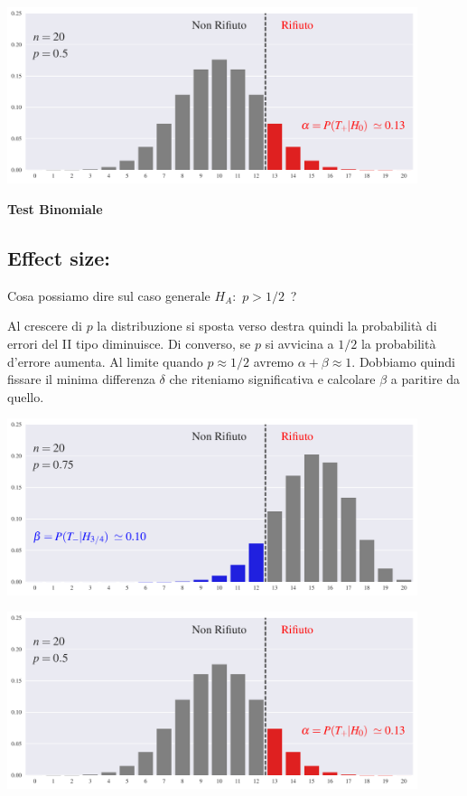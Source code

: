 \documentclass[12pt,openany]{book}
\theoremstyle{mio}
\theoremstyle{liscio}
\begin{document}
\hfil\includegraphics[width=0.9\textwidth]{figure/B-test_01.pdf}




\hfill{}\clearpage\hfill\textbf{Test Binomiale}\subsection{Effect size: \boldmath{$\delta$}}


Cosa possiamo dire sul caso generale $H_A:$ $p>1/2$~?

Al crescere di $p$ la distribuzione si sposta verso destra quindi la probabilità di errori del II tipo diminuisce. Di converso, se $p$ si avvicina a $1/2$  la probabilità d'errore aumenta. Al limite quando $p\approx 1/2$ avremo $\alpha+\beta\approx 1$. Dobbiamo quindi fissare il minima differenza $\delta$ che riteniamo significativa e calcolare $\beta$ a paritire da quello.


\hfil\includegraphics[width=0.9\textwidth]{figure/B-test_02.pdf}

\hfil\includegraphics[width=0.9\textwidth]{figure/B-test_01.pdf}
\end{document}
